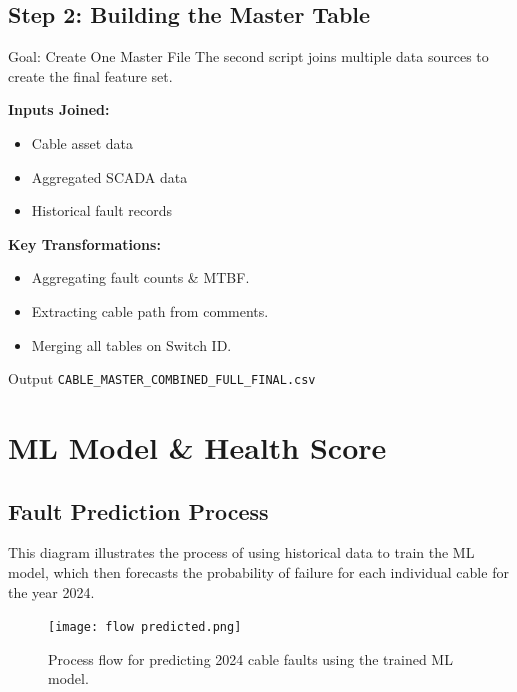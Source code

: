 \documentclass[a4paper,11pt]{article}
\begin{document}
\subsection{Step 2: Building the Master Table}
\begin{alertblock}{Goal: Create One Master File}
    The second script joins multiple data sources to create the final feature set.
\end{alertblock}
\vspace{1em}
\textbf{Inputs Joined:}
\begin{itemize}
    \item Cable asset data
    \item Aggregated SCADA data
    \item Historical fault records
\end{itemize}
\vspace{1em}
\textbf{Key Transformations:}
\begin{itemize}
    \item Aggregating fault counts \& MTBF.
    \item Extracting cable path from comments.
    \item Merging all tables on Switch ID.
\end{itemize}

\begin{block}{Output}
    \texttt{CABLE\_MASTER\_COMBINED\_FULL\_FINAL.csv}
\end{block}
\newpage

\section{ML Model \& Health Score}

\subsection{Fault Prediction Process}
This diagram illustrates the process of using historical data to train the ML model, which then forecasts the probability of failure for each individual cable for the year 2024.
\begin{figure}[h!]
    \centering
    \texttt{[image: flow predicted.png]}
    \caption{Process flow for predicting 2024 cable faults using the trained ML model.}
\end{figure}
\end{document}
